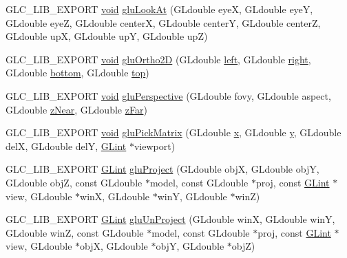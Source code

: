 \begin{DoxyCompactItemize}
\item 
G\-L\-C\-\_\-\-L\-I\-B\-\_\-\-E\-X\-P\-O\-R\-T \hyperlink{group___u_a_v_objects_plugin_ga444cf2ff3f0ecbe028adce838d373f5c}{void} \hyperlink{namespaceglc_aacc237d6a2c7342ab6ef2a01528f0f2c}{glu\-Look\-At} (G\-Ldouble eye\-X, G\-Ldouble eye\-Y, G\-Ldouble eye\-Z, G\-Ldouble center\-X, G\-Ldouble center\-Y, G\-Ldouble center\-Z, G\-Ldouble up\-X, G\-Ldouble up\-Y, G\-Ldouble up\-Z)
\item 
G\-L\-C\-\_\-\-L\-I\-B\-\_\-\-E\-X\-P\-O\-R\-T \hyperlink{group___u_a_v_objects_plugin_ga444cf2ff3f0ecbe028adce838d373f5c}{void} \hyperlink{namespaceglc_afd4fa08568c023f3eb109e6fbe3d6ddb}{glu\-Ortho2\-D} (G\-Ldouble \hyperlink{glext_8h_a85b8f6c07fbc1fb5d77c2ae090f21995}{left}, G\-Ldouble \hyperlink{glext_8h_a5ffadbbacc6b89cf6218bc43b384d3fe}{right}, G\-Ldouble \hyperlink{glext_8h_a95fc257e5ddf46f7db9d5e898cdf1991}{bottom}, G\-Ldouble \hyperlink{glext_8h_a5ab323daeacf8dfdb8f91132fecdca23}{top})
\item 
G\-L\-C\-\_\-\-L\-I\-B\-\_\-\-E\-X\-P\-O\-R\-T \hyperlink{group___u_a_v_objects_plugin_ga444cf2ff3f0ecbe028adce838d373f5c}{void} \hyperlink{namespaceglc_af77baf1a4ba34a0a3acd60315757ac25}{glu\-Perspective} (G\-Ldouble fovy, G\-Ldouble aspect, G\-Ldouble \hyperlink{glext_8h_a12d99226e590bbaaf0be69169eeb4834}{z\-Near}, G\-Ldouble \hyperlink{glext_8h_a18a2583fe65967bceff8903e2769f8e2}{z\-Far})
\item 
G\-L\-C\-\_\-\-L\-I\-B\-\_\-\-E\-X\-P\-O\-R\-T \hyperlink{group___u_a_v_objects_plugin_ga444cf2ff3f0ecbe028adce838d373f5c}{void} \hyperlink{namespaceglc_acc6f83697ed75a5f9dc62c096a4474ac}{glu\-Pick\-Matrix} (G\-Ldouble \hyperlink{glext_8h_a1db9d104e3c2128177f26aff7b46982f}{x}, G\-Ldouble \hyperlink{glext_8h_a42315f3ed8fff752bb47fd782309fcfc}{y}, G\-Ldouble del\-X, G\-Ldouble del\-Y, \hyperlink{glext_8h_aacf898e4ecb940565baac883dc587ff0}{G\-Lint} $\ast$viewport)
\item 
G\-L\-C\-\_\-\-L\-I\-B\-\_\-\-E\-X\-P\-O\-R\-T \hyperlink{glext_8h_aacf898e4ecb940565baac883dc587ff0}{G\-Lint} \hyperlink{namespaceglc_ac32348c47dfbc3d69bb3492207fab1cb}{glu\-Project} (G\-Ldouble obj\-X, G\-Ldouble obj\-Y, G\-Ldouble obj\-Z, const G\-Ldouble $\ast$model, const G\-Ldouble $\ast$proj, const \hyperlink{glext_8h_aacf898e4ecb940565baac883dc587ff0}{G\-Lint} $\ast$view, G\-Ldouble $\ast$win\-X, G\-Ldouble $\ast$win\-Y, G\-Ldouble $\ast$win\-Z)
\item 
G\-L\-C\-\_\-\-L\-I\-B\-\_\-\-E\-X\-P\-O\-R\-T \hyperlink{glext_8h_aacf898e4ecb940565baac883dc587ff0}{G\-Lint} \hyperlink{namespaceglc_a53bc7fb9bfafe7556ccc50e944d2ef0d}{glu\-Un\-Project} (G\-Ldouble win\-X, G\-Ldouble win\-Y, G\-Ldouble win\-Z, const G\-Ldouble $\ast$model, const G\-Ldouble $\ast$proj, const \hyperlink{glext_8h_aacf898e4ecb940565baac883dc587ff0}{G\-Lint} $\ast$view, G\-Ldouble $\ast$obj\-X, G\-Ldouble $\ast$obj\-Y, G\-Ldouble $\ast$obj\-Z)

\end{DoxyCompactItemize}
